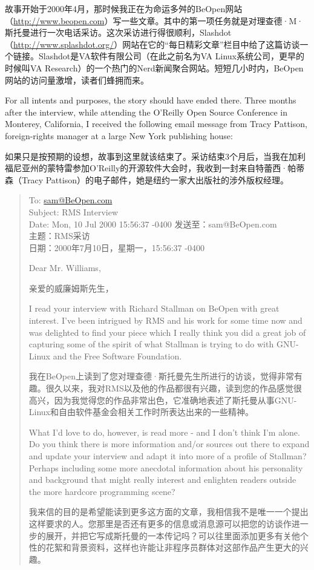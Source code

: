 \ifdefined\chs
故事开始于2000年4月，那时候我正在为命运多舛的BeOpen网站（\url{http://www.beopen.com}）写一些文章。其中的第一项任务就是对理查德·M·斯托曼进行一次电话采访。这次采访进行得很顺利，Slashdot（\url{http://www.splashdot.org/}）网站在它的``每日精彩文章''栏目中给了这篇访谈一个链接。Slashdot是VA软件有限公司（在此之前名为VA Linux系统公司，更早的时候叫VA Research）的一个热门的Nerd新闻聚合网站。短短几小时内，BeOpen网站的访问量激增，读者们蜂拥而来。
\fi

\ifdefined\eng
For all intents and purposes, the story should have ended there. Three months after the interview, while attending the O'Reilly Open Source Conference in Monterey, California, I received the following email message from Tracy Pattison, foreign-rights manager at a large New York publishing house:
\fi

\ifdefined\chs
如果只是按预期的设想，故事到这里就该结束了。采访结束3个月后，当我在加利福尼亚州的蒙特雷参加O'Reilly的开源软件大会时，我收到一封来自特蕾西·帕蒂森（Tracy Pattison）的电子邮件，她是纽约一家大出版社的涉外版权经理。
\fi

\begin{quote}
\ifdefined\eng
To: \url{sam@BeOpen.com}\\Subject: RMS Interview\\Date: Mon, 10 Jul 2000 15:56:37 -0400
\fi
\ifdefined\chs
发送至：sam@BeOpen.com\\主题：RMS采访\\日期：2000年7月10日，星期一，15:56:37 -0400 
\fi

\ifdefined\eng
Dear Mr. Williams,
\fi

\ifdefined\chs
亲爱的威廉姆斯先生，
\fi

\ifdefined\eng
I read your interview with Richard Stallman on BeOpen with great interest. I've been intrigued by RMS and his work for some time now and was delighted to find your piece which I really think you did a great job of capturing some of the spirit of what Stallman is trying to do with GNU-Linux and the Free Software Foundation.
\fi

\ifdefined\chs
我在BeOpen上读到了您对理查德·斯托曼先生所进行的访谈，觉得非常有趣。很久以来，我对RMS以及他的作品都很有兴趣，读到您的作品感觉很高兴，因为我觉得您的作品非常出色，它准确地表述了斯托曼从事GNU-Linux和自由软件基金会相关工作时所表达出来的一些精神。
\fi

\ifdefined\eng
What I'd love to do, however, is read more - and I don't think I'm alone. Do you think there is more information and/or sources out there to expand and update your interview and adapt it into more of a profile of Stallman? Perhaps including some more anecdotal information about his personality and background that might really interest and enlighten readers outside the more hardcore programming scene?
\fi

\ifdefined\chs
我来信的目的是希望能读到更多这方面的文章，我相信我不是唯一一个提出这样要求的人。您那里是否还有更多的信息或消息源可以把您的访谈作进一步的展开，并把它写成斯托曼的一本传记吗？可以往里面添加更多有关他个性的花絮和背景资料，这样也许能让非程序员群体对这部作品产生更大的兴趣。
\fi
\end{quote}


